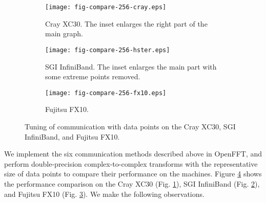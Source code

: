 \begin{figure}[htbp]
        \begin{subfigure}{\textwidth}
                \centering
                \texttt{[image: fig-compare-256-cray.eps]}
                \caption{Cray XC30. The inset enlarges the right part of the main graph.}
                \label{fig-tuning-cray}
        \end{subfigure}

        \begin{subfigure}{\textwidth}
                \centering
                \texttt{[image: fig-compare-256-hster.eps]}
                \caption{SGI InfiniBand. The inset enlarges the main part with some extreme points removed.}
                \label{fig-tuning-hster}
        \end{subfigure}

        \begin{subfigure}{\textwidth}
                \centering
                \texttt{[image: fig-compare-256-fx10.eps]}
                \caption{Fujitsu FX10.}
                \label{fig-tuning-fx10}
        \end{subfigure}\caption{Tuning of communication with  data points on the Cray XC30, SGI InfiniBand, and Fujitsu FX10.}\label{fig-tuning-comm}
\end{figure}

We implement the six communication methods described above in OpenFFT, and perform double-precision complex-to-complex transforms with the representative size of  data points to compare their performance on the machines. 
Figure \ref{fig-tuning-comm} shows the performance comparison on the Cray XC30 (Fig. \ref{fig-tuning-cray}), SGI InfiniBand (Fig. \ref{fig-tuning-hster}), and Fujitsu FX10 (Fig. \ref{fig-tuning-fx10}). We make the following observations. 

